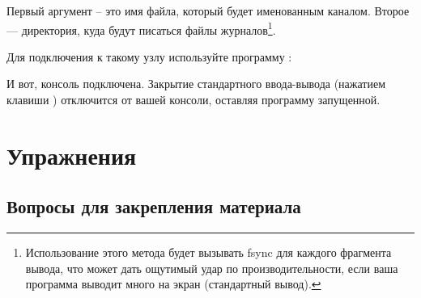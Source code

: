 \documentclass[11pt, oneside]{book}   	%
\newcommand{\ReviewTitle}{Вопросы для закрепления материала}
\begin{document}
Первый аргумент -- это имя файла, который будет именованным каналом. Второе --- директория, куда будут писаться файлы журналов\footnote{Использование этого метода будет вызывать fsync для каждого фрагмента вывода, что может дать ощутимый удар по производительности, если ваша программа выводит много на экран (стандартный вывод).}.

Для подключения к такому узлу используйте программу :


И вот, консоль подключена. Закрытие стандартного ввода-вывода (нажатием клавиши ) отключится от вашей консоли, оставляя программу запущенной.


\section{Упражнения}

\subsection*{\ReviewTitle{}}
\end{document}
